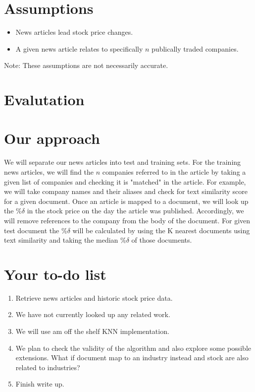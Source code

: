 \documentclass[11pt,letterpaper]{article}
\newcommand{\blue}[1]{\textcolor{RoyalBlue}{#1}}
\newcommand{\instructions}[1]{\blue{\textit{#1}}}
\renewcommand{\instructions}[1]{}
\begin{document}
\section*{Assumptions}
  \begin{itemize}
  \item News articles lead stock price changes.
  \item A given news article relates to specifically $n$ publically traded companies.
  \end{itemize}
  Note: These assumptions are not necessarily accurate.
  
\instructions{Do you have data to train and test your system on? How
  will you evaluate your system?}
  
\section*{Evalutation}


\section*{Our approach}
  We will separate our news articles into test and training sets. For the training news
  articles, we will find the $n$ companies referred to in the article by taking a given
  list of companies and checking it is "matched" in the article. For example, we will
  take company names and their aliases and check for text similarity score for a given
  document. Once an article is mapped to a document, we will look up the $\%\delta$ in
  the stock price on the day the article was published. Accordingly, we will remove references
  to the company from the body of the document. For given test document the $\%\delta$
  will be calculated by using the K nearest documents using text similarity
  and taking the median $\%\delta$ of those documents.
\instructions{Describe how you want to tackle this task}

\section*{Your to-do list}
\instructions{Get started by making a to-do list. If you have a group
  project: who will do what? Set yourself deadlines. Here are a few
  items that might appear on your to-do list}
\begin{enumerate}
\item Retrieve news articles and historic stock price data.
\item We have not currently looked up any related work.
\item We will use am off the shelf KNN implementation.
\item We plan to check the validity of the algorithm and also explore some possible
  extensions. What if document map to an industry instead and stock are also related
  to industries?
\item Finish write up.
\end{enumerate}
\end{document}
